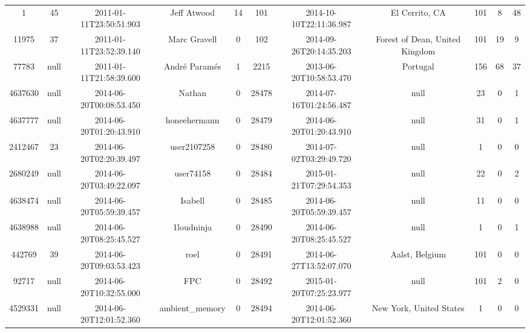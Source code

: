 \documentclass[12pt,a4paper,twoside,openright,titlepage,final]{article}
\begin{document}
\begin{landscape}
\begin{center}
\begin{longtable}{@{\extracolsep{\fill}}*{11}{c}}
			1         & 45   & 2011-01-11T23:50:51.903 & Jeff Atwood           & 14        & 101   & 2014-10-10T22:11:36.987 & El Cerrito, CA                   & 101        & 8       & 48    \\
			11975     & 37   & 2011-01-11T23:52:39.140 & Marc Gravell          & 0         & 102   & 2014-09-26T20:14:35.203 & Forest of Dean, United Kingdom   & 101        & 19      & 9     \\
			77783     & null & 2011-01-11T21:58:39.600 & André Paramés         & 1         & 2215  & 2013-06-20T10:58:53.470 & Portugal                         & 156        & 68      & 37    \\
			4637630   & null & 2014-06-20T00:08:53.450 & Nathan                & 0         & 28478 & 2014-07-16T01:24:56.487 & null                             & 23         & 0       & 1     \\
			4637777   & null & 2014-06-20T01:20:43.910 & honeehermann          & 0         & 28479 & 2014-06-20T01:20:43.910 & null                             & 31         & 0       & 1     \\
			2412467   & 23   & 2014-06-20T02:20:39.497 & user2107258           & 0         & 28480 & 2014-07-02T03:29:49.720 & null                             & 1          & 0       & 0     \\
			2680249   & null & 2014-06-20T03:49:22.097 & user74158             & 0         & 28484 & 2015-01-21T07:29:54.353 & null                             & 22         & 0       & 2     \\
			4638474   & null & 2014-06-20T05:59:39.457 & Isabell               & 0         & 28485 & 2014-06-20T05:59:39.457 & null                             & 11         & 0       & 0     \\
			4638988   & null & 2014-06-20T08:25:45.527 & 1loudninja            & 0         & 28490 & 2014-06-20T08:25:45.527 & null                             & 1          & 0       & 1     \\
			442769    & 39   & 2014-06-20T09:03:53.423 & roel                  & 0         & 28491 & 2014-06-27T13:52:07.070 & Aalst, Belgium                   & 101        & 0       & 0     \\
			92717     & null & 2014-06-20T10:32:55.000 & FPC                   & 0         & 28492 & 2015-01-20T07:25:23.977 & null                             & 101        & 2       & 0     \\
			4529331   & null & 2014-06-20T12:01:52.360 & ambient\_memory       & 0         & 28494 & 2014-06-20T12:01:52.360 & New York, United States          & 1          & 0       & 0     \\
\end{longtable}
\end{center}
\end{landscape}
\end{document}
